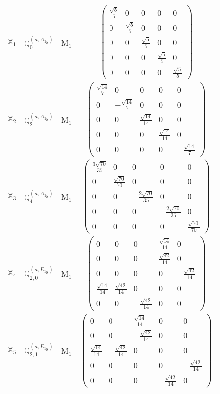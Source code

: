 \documentclass[fleqn,10pt,landscape]{article}
\begin{document}
\begin{itemize}
\begin{center}
\begin{longtable}{c|c|c|c}
$ \mathbb{X}_{1} $ & $\mathbb{Q}_{0}^{(a,A_{1g})}$ & M$_{1}$ & $\begin{pmatrix} \frac{\sqrt{5}}{5} & 0 & 0 & 0 & 0 \\ 0 & \frac{\sqrt{5}}{5} & 0 & 0 & 0 \\ 0 & 0 & \frac{\sqrt{5}}{5} & 0 & 0 \\ 0 & 0 & 0 & \frac{\sqrt{5}}{5} & 0 \\ 0 & 0 & 0 & 0 & \frac{\sqrt{5}}{5} \end{pmatrix}$ \\
$ \mathbb{X}_{2} $ & $\mathbb{Q}_{2}^{(a,A_{1g})}$ & M$_{1}$ & $\begin{pmatrix} \frac{\sqrt{14}}{7} & 0 & 0 & 0 & 0 \\ 0 & - \frac{\sqrt{14}}{7} & 0 & 0 & 0 \\ 0 & 0 & \frac{\sqrt{14}}{14} & 0 & 0 \\ 0 & 0 & 0 & \frac{\sqrt{14}}{14} & 0 \\ 0 & 0 & 0 & 0 & - \frac{\sqrt{14}}{7} \end{pmatrix}$ \\
$ \mathbb{X}_{3} $ & $\mathbb{Q}_{4}^{(a,A_{1g})}$ & M$_{1}$ & $\begin{pmatrix} \frac{3 \sqrt{70}}{35} & 0 & 0 & 0 & 0 \\ 0 & \frac{\sqrt{70}}{70} & 0 & 0 & 0 \\ 0 & 0 & - \frac{2 \sqrt{70}}{35} & 0 & 0 \\ 0 & 0 & 0 & - \frac{2 \sqrt{70}}{35} & 0 \\ 0 & 0 & 0 & 0 & \frac{\sqrt{70}}{70} \end{pmatrix}$ \\
$ \mathbb{X}_{4} $ & $\mathbb{Q}_{2,0}^{(a,E_{1g})}$ & M$_{1}$ & $\begin{pmatrix} 0 & 0 & 0 & \frac{\sqrt{14}}{14} & 0 \\ 0 & 0 & 0 & \frac{\sqrt{42}}{14} & 0 \\ 0 & 0 & 0 & 0 & - \frac{\sqrt{42}}{14} \\ \frac{\sqrt{14}}{14} & \frac{\sqrt{42}}{14} & 0 & 0 & 0 \\ 0 & 0 & - \frac{\sqrt{42}}{14} & 0 & 0 \end{pmatrix}$ \\
$ \mathbb{X}_{5} $ & $\mathbb{Q}_{2,1}^{(a,E_{1g})}$ & M$_{1}$ & $\begin{pmatrix} 0 & 0 & \frac{\sqrt{14}}{14} & 0 & 0 \\ 0 & 0 & - \frac{\sqrt{42}}{14} & 0 & 0 \\ \frac{\sqrt{14}}{14} & - \frac{\sqrt{42}}{14} & 0 & 0 & 0 \\ 0 & 0 & 0 & 0 & - \frac{\sqrt{42}}{14} \\ 0 & 0 & 0 & - \frac{\sqrt{42}}{14} & 0 \end{pmatrix}$ \\

\end{longtable}
\end{center}
\end{itemize}
\end{document}

